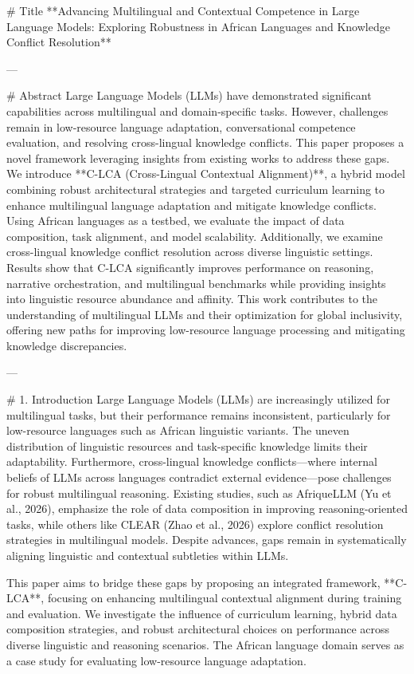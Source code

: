 # Title  
**Advancing Multilingual and Contextual Competence in Large Language Models: Exploring Robustness in African Languages and Knowledge Conflict Resolution**

---

# Abstract  
Large Language Models (LLMs) have demonstrated significant capabilities across multilingual and domain-specific tasks. However, challenges remain in low-resource language adaptation, conversational competence evaluation, and resolving cross-lingual knowledge conflicts. This paper proposes a novel framework leveraging insights from existing works to address these gaps. We introduce **C-LCA (Cross-Lingual Contextual Alignment)**, a hybrid model combining robust architectural strategies and targeted curriculum learning to enhance multilingual language adaptation and mitigate knowledge conflicts. Using African languages as a testbed, we evaluate the impact of data composition, task alignment, and model scalability. Additionally, we examine cross-lingual knowledge conflict resolution across diverse linguistic settings. Results show that C-LCA significantly improves performance on reasoning, narrative orchestration, and multilingual benchmarks while providing insights into linguistic resource abundance and affinity. This work contributes to the understanding of multilingual LLMs and their optimization for global inclusivity, offering new paths for improving low-resource language processing and mitigating knowledge discrepancies.

---

# 1. Introduction  
Large Language Models (LLMs) are increasingly utilized for multilingual tasks, but their performance remains inconsistent, particularly for low-resource languages such as African linguistic variants. The uneven distribution of linguistic resources and task-specific knowledge limits their adaptability. Furthermore, cross-lingual knowledge conflicts—where internal beliefs of LLMs across languages contradict external evidence—pose challenges for robust multilingual reasoning. Existing studies, such as AfriqueLLM (Yu et al., 2026), emphasize the role of data composition in improving reasoning-oriented tasks, while others like CLEAR (Zhao et al., 2026) explore conflict resolution strategies in multilingual models. Despite advances, gaps remain in systematically aligning linguistic and contextual subtleties within LLMs.

This paper aims to bridge these gaps by proposing an integrated framework, **C-LCA**, focusing on enhancing multilingual contextual alignment during training and evaluation. We investigate the influence of curriculum learning, hybrid data composition strategies, and robust architectural choices on performance across diverse linguistic and reasoning scenarios. The African language domain serves as a case study for evaluating low-resource language adaptation.

